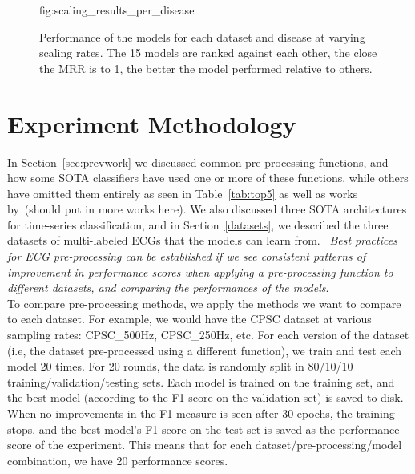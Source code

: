 \documentclass[pmlr,twocolumn]{jmlr}%
\begin{document}
\begin{figure}[t]
\floatconts
  {fig:scaling_results_per_disease}
  {\caption{Performance of the models for each dataset and disease at varying scaling rates. The 15 models are ranked against each other, the close the MRR is to 1, the better the model performed relative to others.}}
  {
  
  
  }
\end{figure}
\section{Experiment Methodology}
\label{sec:experiment}

In Section~\ref{sec:prevwork} we discussed common pre-processing functions, and how some SOTA classifiers have used one or more of these functions, while others have omitted them entirely as seen in Table~\ref{tab:top5} as well as works by~\cite{ribeiro2020automatic}{\color{red}(should put in more works here)}. We also discussed three SOTA architectures for time-series classification, and in Section~\ref{datasets}, we described the three datasets of multi-labeled ECGs that the models can learn from. ~\textit{Best practices for ECG pre-processing can be established if we see consistent patterns of improvement in performance scores when applying a pre-processing function to different datasets, and comparing the performances of the models}. \\

To compare pre-processing methods, we apply the methods we want to compare to each dataset. For example, we would have the CPSC dataset at various sampling rates: CPSC\_500Hz, CPSC\_250Hz, etc. For each version of the dataset (i.e, the dataset pre-processed using a different function), we train and test each model 20 times. For 20 rounds, the data is randomly split in 80/10/10 training/validation/testing sets. Each model is trained on the training set, and the best model (according to the F1 score on the validation set) is saved to disk. When no improvements in the F1 measure is seen after 30 epochs, the training stops, and the best model's F1 score on the test set is saved as the performance score of the experiment. This means that for each dataset/pre-processing/model combination, we have 20 performance scores. 
\end{document}
